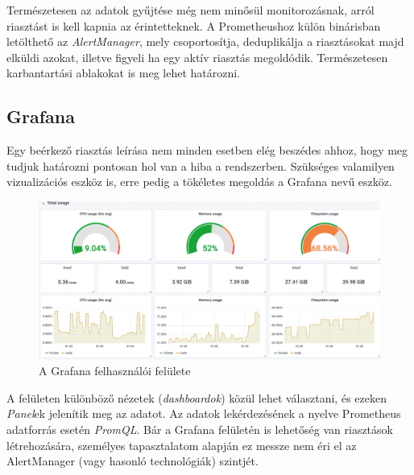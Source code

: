 Természetesen az adatok gyűjtése még nem minősül monitorozásnak, arról riasztást is kell kapnia az érintetteknek. A Prometheushoz külön binárisban letölthető az \textit{AlertManager}, mely csoportosítja, deduplikálja a riasztásokat majd elküldi azokat, illetve figyeli ha egy aktív riasztás megoldódik. Természetesen karbantartási ablakokat is meg lehet határozni.
\subsection{Grafana}
Egy beérkező riasztás leírása nem minden esetben elég beszédes ahhoz, hogy meg tudjuk határozni pontosan hol van a hiba a rendszerben. Szükséges valamilyen vizualizációs eszköz is, erre pedig a tökéletes megoldás a Grafana nevű eszköz.
\begin{figure}[ht]
\centering
\includegraphics[width=150mm, keepaspectratio]{img/grafanaui.png}
\caption{A Grafana felhasználói felülete}
\end{figure}
\vskip 0.1in
A felületen különböző nézetek (\textit{dashboardok}) közül lehet választani, és ezeken \textit{Panel}ek jelenítik meg az adatot. Az adatok lekérdezésének a nyelve Prometheus adatforrás esetén \textit{PromQL}. Bár a Grafana felületén is lehetőség van riasztások létrehozására, személyes tapasztalatom alapján ez messze nem éri el az AlertManager (vagy hasonló technológiák) szintjét.